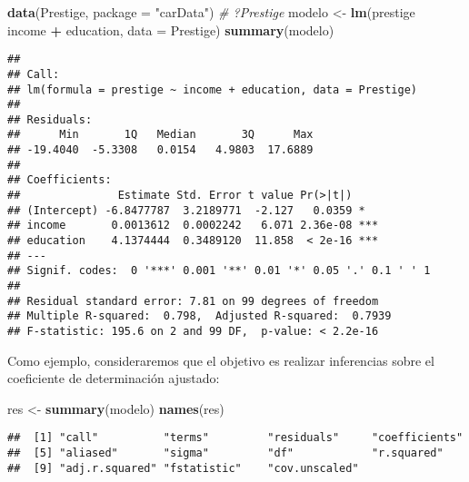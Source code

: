 \documentclass[
]{book}
\newenvironment{Shaded}{\begin{snugshade}}{\end{snugshade}}
\newcommand{\CommentTok}[1]{\textcolor[rgb]{0.56,0.35,0.01}{\textit{#1}}}
\newcommand{\DataTypeTok}[1]{\textcolor[rgb]{0.13,0.29,0.53}{#1}}
\newcommand{\KeywordTok}[1]{\textcolor[rgb]{0.13,0.29,0.53}{\textbf{#1}}}
\newcommand{\NormalTok}[1]{#1}
\newcommand{\OperatorTok}[1]{\textcolor[rgb]{0.81,0.36,0.00}{\textbf{#1}}}
\newcommand{\StringTok}[1]{\textcolor[rgb]{0.31,0.60,0.02}{#1}}
\theoremstyle{break}
\theoremstyle{definition}
\theoremstyle{definition}
\theoremstyle{definition}
\theoremstyle{remark}
\begin{document}
\begin{Shaded}
\begin{Highlighting}[]
\KeywordTok{data}\NormalTok{(Prestige, }\DataTypeTok{package =} \StringTok{"carData"}\NormalTok{)}
\CommentTok{# ?Prestige}
\NormalTok{modelo <-}\StringTok{ }\KeywordTok{lm}\NormalTok{(prestige }\OperatorTok{~}\StringTok{ }\NormalTok{income }\OperatorTok{+}\StringTok{ }\NormalTok{education, }\DataTypeTok{data =}\NormalTok{ Prestige)}
\KeywordTok{summary}\NormalTok{(modelo)}
\end{Highlighting}
\end{Shaded}

\begin{verbatim}
## 
## Call:
## lm(formula = prestige ~ income + education, data = Prestige)
## 
## Residuals:
##      Min       1Q   Median       3Q      Max 
## -19.4040  -5.3308   0.0154   4.9803  17.6889 
## 
## Coefficients:
##               Estimate Std. Error t value Pr(>|t|)    
## (Intercept) -6.8477787  3.2189771  -2.127   0.0359 *  
## income       0.0013612  0.0002242   6.071 2.36e-08 ***
## education    4.1374444  0.3489120  11.858  < 2e-16 ***
## ---
## Signif. codes:  0 '***' 0.001 '**' 0.01 '*' 0.05 '.' 0.1 ' ' 1
## 
## Residual standard error: 7.81 on 99 degrees of freedom
## Multiple R-squared:  0.798,  Adjusted R-squared:  0.7939 
## F-statistic: 195.6 on 2 and 99 DF,  p-value: < 2.2e-16
\end{verbatim}

Como ejemplo, consideraremos que el objetivo es realizar inferencias sobre el coeficiente de determinación ajustado:

\begin{Shaded}
\begin{Highlighting}[]
\NormalTok{res <-}\StringTok{ }\KeywordTok{summary}\NormalTok{(modelo)}
\KeywordTok{names}\NormalTok{(res)}
\end{Highlighting}
\end{Shaded}

\begin{verbatim}
##  [1] "call"          "terms"         "residuals"     "coefficients" 
##  [5] "aliased"       "sigma"         "df"            "r.squared"    
##  [9] "adj.r.squared" "fstatistic"    "cov.unscaled"
\end{verbatim}

\begin{Shaded}
\end{Shaded}
\end{document}
